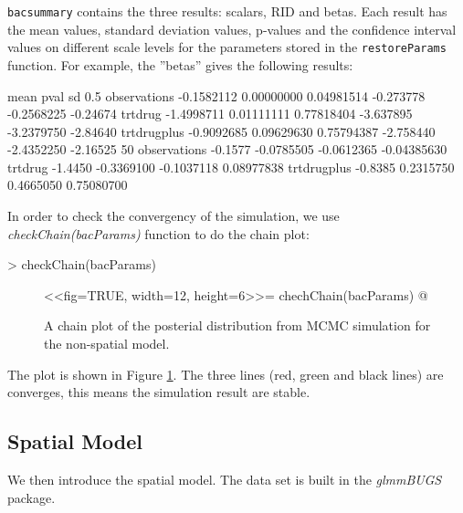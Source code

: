 \documentclass{article}
\begin{document}
\verb!bacsummary! contains the three results: scalars, RID and betas. Each result has the mean values, standard deviation values, p-values and the confidence interval values on different scale levels for the parameters stored in the \verb!restoreParams! function. 
For example, the ''betas'' gives the following results:
\begin{Schunk}
\begin{Soutput}
                   mean       pval         sd      0.5%       2.5%       5%
observations -0.1582112 0.00000000 0.04981514 -0.273778 -0.2568225 -0.24674
trtdrug      -1.4998711 0.01111111 0.77818404 -3.637895 -3.2379750 -2.84640
trtdrugplus  -0.9092685 0.09629630 0.75794387 -2.758440 -2.4352250 -2.16525
                 50%        95%      97.5%       99.5%
observations -0.1577 -0.0785505 -0.0612365 -0.04385630
trtdrug      -1.4450 -0.3369100 -0.1037118  0.08977838
trtdrugplus  -0.8385  0.2315750  0.4665050  0.75080700
\end{Soutput}
\end{Schunk}
                                                                                   

 

In order to check the convergency of the simulation, we use \textit{checkChain(bacParams)} function to do the chain plot:
\begin{Schunk}
\begin{Sinput}
> checkChain(bacParams)
\end{Sinput}
\end{Schunk}



\begin{figure}[ht]
 \centering
 <<fig=TRUE, width=12, height=6>>=
 chechChain(bacParams)
 @
 \caption{A chain plot of the posterial distribution from MCMC simulation for the non-spatial model.}\label{chain}
\end{figure}

The plot is shown in Figure \ref{chain}. The three lines (red, green and black lines) are converges, this means the simulation result are stable. 



\subsection{Spatial Model} 
We then introduce the spatial model. The data set is built in the \textit{glmmBUGS} package. 
\end{document}
